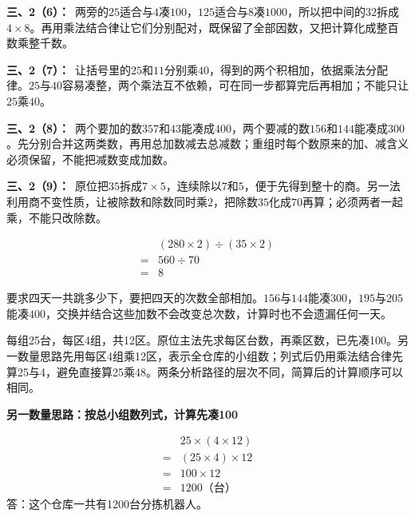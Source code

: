 \documentclass[multi=snippet,border=0pt]{standalone}
\newenvironment{snippet}[3]{\begin{minipage}{#1bp}\color{answerred}\fontsize{#2}{#3}\selectfont\raggedright}{\end{minipage}}
\begin{document}
\begin{snippet}{505}{11.5}{14}\textbf{三、2（6）：}\ 两旁的\(25\)适合与\(4\)凑\(100\)，\(125\)适合与\(8\)凑\(1000\)，所以把中间的\(32\)拆成\(4\times8\)。再用乘法结合律让它们分别配对，既保留了全部因数，又把计算化成整百数乘整千数。\end{snippet}
\begin{snippet}{505}{11.5}{14}\textbf{三、2（7）：}\ 让括号里的\(25\)和\(11\)分别乘\(40\)，得到的两个积相加，依据乘法分配律。\(25\)与\(40\)容易凑整，两个乘法互不依赖，可在同一步都算完后再相加；不能只让\(25\)乘\(40\)。\end{snippet}
\begin{snippet}{505}{11.5}{14}\textbf{三、2（8）：}\ 两个要加的数\(357\)和\(43\)能凑成\(400\)，两个要减的数\(156\)和\(144\)能凑成\(300\)。先分别合并这两类数，再用总加数减去总减数；重组时每个数原来的加、减含义必须保留，不能把减数变成加数。\end{snippet}
\begin{snippet}{505}{11.5}{14}\textbf{三、2（9）：}\ 原位把\(35\)拆成\(7\times5\)，连续除以\(7\)和\(5\)，便于先得到整十的商。另一法利用商不变性质，让被除数和除数同时乘\(2\)，把除数\(35\)化成\(70\)再算；必须两者一起乘，不能只改除数。\par \[\begin{aligned}&(280\times2)\div(35\times2)\\={}&560\div70\\={}&8\end{aligned}\]\end{snippet}
\begin{snippet}{505}{11.5}{14}要求四天一共跳多少下，要把四天的次数全部相加。\(156\)与\(144\)能凑\(300\)，\(195\)与\(205\)能凑\(400\)，交换并结合这些加数不会改变总次数，计算时也不会遗漏任何一天。\end{snippet}
\begin{snippet}{505}{11.5}{14}每组25台，每区4组，共12区。原位主法先求每区台数，再乘区数，已先凑100。另一数量思路先用每区4组乘12区，表示全仓库的小组数；列式后仍用乘法结合律先算25与4，避免直接算25乘48。两条分析路径的层次不同，简算后的计算顺序可以相同。\par \textbf{另一数量思路：按总小组数列式，计算先凑100}\par \[\begin{aligned}&25\times(4\times12)\\={}&(25\times4)\times12\\={}&100\times12\\={}&1200\text{（台）}\end{aligned}\]答：这个仓库一共有1200台分拣机器人。\end{snippet}
\end{document}
